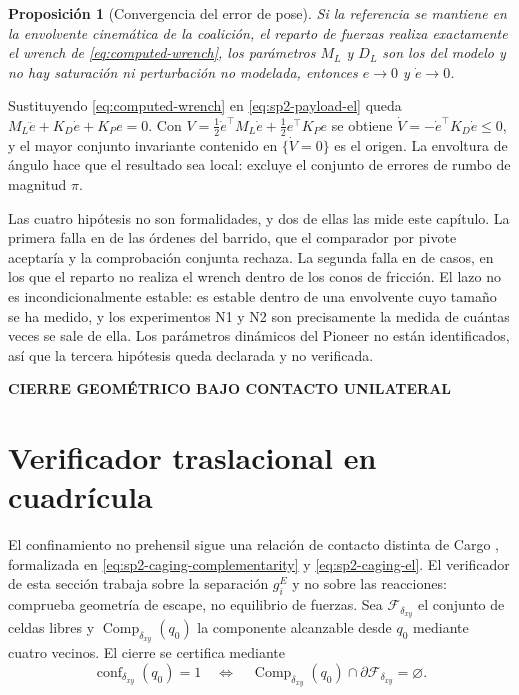 \documentclass[12pt,a4paper]{article}
\newcommand{\leveltag}[1]{%
  \Needspace{5.5\baselineskip}%
  \noindent\colorbox{VIUDark}{%
    \parbox{\dimexpr\textwidth-2\fboxsep\relax}{%
      \color{white}\sffamily\bfseries\small #1%
    }%
  }\par\smallskip
}
\newtheorem{sp2prop}{Proposición}
\begin{document}
\begin{sp2prop}[Convergencia del error de pose]
Si la referencia se mantiene en la envolvente cinemática de la coalición, el
reparto de fuerzas realiza exactamente el wrench de \eqref{eq:computed-wrench},
los parámetros $M_L$ y $D_L$ son los del modelo y no hay saturación ni
perturbación no modelada, entonces $e\to0$ y $\dot e\to0$.
\end{sp2prop}

Sustituyendo \eqref{eq:computed-wrench} en \eqref{eq:sp2-payload-el} queda
$M_L\ddot e+K_D\dot e+K_Pe=0$. Con
$V=\tfrac12\dot e^\top M_L\dot e+\tfrac12e^\top K_Pe$ se obtiene
$\dot V=-\dot e^\top K_D\dot e\leq0$, y el mayor conjunto invariante contenido
en $\{\dot V=0\}$ es el origen. La envoltura de ángulo hace que el resultado sea
local: excluye el conjunto de errores de rumbo de magnitud $\pi$.

Las cuatro hipótesis no son formalidades, y dos de ellas las mide este capítulo.
La primera falla en \SPTwoReadyNOneFalse{} de las \SPTwoReadyNOneRows{} órdenes
del barrido, que el comparador por pivote aceptaría y la comprobación conjunta
rechaza. La segunda falla en \SPTwoReadyNTwoFalse{} de \SPTwoReadyNTwoRows{}
casos, en los que el reparto no realiza el wrench dentro de los conos de
fricción. El
lazo no es incondicionalmente estable: es estable dentro de una envolvente cuyo
tamaño se ha medido, y los experimentos N1 y N2 son precisamente la medida de
cuántas veces se sale de ella. Los parámetros dinámicos del Pioneer no están
identificados, así que la tercera hipótesis queda declarada y no verificada.

\leveltag{CIERRE GEOMÉTRICO BAJO CONTACTO UNILATERAL}
\section*{Verificador traslacional en cuadrícula}

El confinamiento no prehensil sigue una relación de contacto distinta de Cargo
\parencite{pereira2004caging,fink2008caging}, formalizada en
\eqref{eq:sp2-caging-complementarity} y \eqref{eq:sp2-caging-el}. El verificador
de esta sección trabaja sobre la separación $g_i^{E}$ y no sobre las reacciones:
comprueba geometría de escape, no equilibrio de fuerzas. Sea $\mathcal F_{\delta_{xy}}$ el
conjunto de celdas libres y $\operatorname{Comp}_{\delta_{xy}}(q_0)$ la
componente alcanzable desde $q_0$ mediante cuatro vecinos. El cierre se
certifica mediante
\begin{equation}
\operatorname{conf}_{\delta_{xy}}(q_0)=1
\quad\Longleftrightarrow\quad
\operatorname{Comp}_{\delta_{xy}}(q_0)
\cap\partial\mathcal F_{\delta_{xy}}=\varnothing .
\label{eq:grid-cage}
\end{equation}
\end{document}
